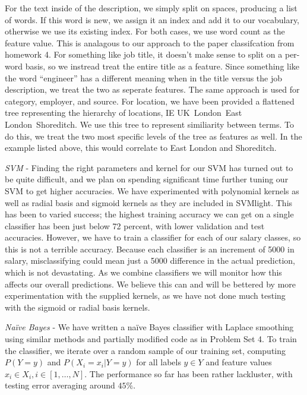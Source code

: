 \documentclass{pset}
\begin{document}
For the text inside of the description, we simply split on spaces, producing a
list of words. If this word is new, we assign it an index and add it to our
vocabulary, otherwise we use its existing index. For both cases, we use word
count as the feature value. This is analagous to our approach to the paper
classifcation from homework 4. For something like job title, it doesn't make
sense to split on a per-word basis, so we instread treat the entire title as a
feature. Since something like the word ``engineer'' has a different meaning when
in the title versus the job description, we treat the two as seperate features.
The same approach is used for category, employer, and source. For location, we
have been provided a flattened tree representing the hierarchy of locations, IE
UK~London~East London~Shoreditch. We use this tree to represent similiarity
between terms. To do this, we treat the two most specific levels of the tree as
features as well. In the example listed above, this would correlate to East
London and Shoreditch.

{\it SVM} - Finding the right parameters and kernel for our SVM has turned out
to be quite difficult, and we plan on spending significant time further tuning our SVM
to get higher accuracies. We have experimented with polynomial kernels as well
as radial basis and sigmoid kernels as they are included in SVMlight. This has
been to varied success; the highest training accuracy we can get on a single
classifier has been just below 72 percent, with lower validation and test accuracies.
 However, we have to train a classifier for each of our salary classes, so this is not a 
terrible accuracy. Because each classifier is an increment of 5000 in salary,
misclassifying could mean just a 5000 difference in the actual prediction, which is not
devastating. As we combine classifiers we will monitor how this affects our overall
predictions. We believe this can and will be bettered by more experimentation with the
supplied kernels, as we have not done much testing with the sigmoid or radial
basis kernels.

{\it Naïve Bayes} - We have written a naïve Bayes classifier with Laplace
smoothing using similar methods and partially modified code as in Problem Set 4.
To train the classifier, we iterate over a random sample of our training set,
computing $P(Y=y)$ and $P(X_i=x_i|Y=y)$ for all labels $y\in Y$ and feature
values $x_i\in X_i, i\in[1,\ldots,N]$. The performance so far has been rather
lackluster, with testing error averaging around $45\%$.
\end{document}
